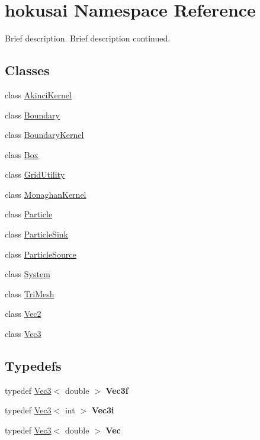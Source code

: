 \hypertarget{namespacehokusai}{\section{hokusai Namespace Reference}
\label{namespacehokusai}
}


Brief description. Brief description continued.  


\subsection*{Classes}
\begin{DoxyCompactItemize}
\item 
class \hyperlink{classhokusai_1_1AkinciKernel}{Akinci\+Kernel}
\item 
class \hyperlink{classhokusai_1_1Boundary}{Boundary}
\item 
class \hyperlink{classhokusai_1_1BoundaryKernel}{Boundary\+Kernel}
\item 
class \hyperlink{classhokusai_1_1Box}{Box}
\item 
class \hyperlink{classhokusai_1_1GridUtility}{Grid\+Utility}
\item 
class \hyperlink{classhokusai_1_1MonaghanKernel}{Monaghan\+Kernel}
\item 
class \hyperlink{classhokusai_1_1Particle}{Particle}
\item 
class \hyperlink{classhokusai_1_1ParticleSink}{Particle\+Sink}
\item 
class \hyperlink{classhokusai_1_1ParticleSource}{Particle\+Source}
\item 
class \hyperlink{classhokusai_1_1System}{System}
\item 
class \hyperlink{classhokusai_1_1TriMesh}{Tri\+Mesh}
\item 
class \hyperlink{classhokusai_1_1Vec2}{Vec2}
\item 
class \hyperlink{classhokusai_1_1Vec3}{Vec3}
\end{DoxyCompactItemize}
\subsection*{Typedefs}
\begin{DoxyCompactItemize}
\item 
\hypertarget{namespacehokusai_ac3f250cf2a411184737a6fd288c90b59}{typedef \hyperlink{classhokusai_1_1Vec3}{Vec3}$<$ double $>$ {\bfseries Vec3f}}\label{namespacehokusai_ac3f250cf2a411184737a6fd288c90b59}

\item 
\hypertarget{namespacehokusai_aac43f7e45c8dd98baefd1e55cd0dd15e}{typedef \hyperlink{classhokusai_1_1Vec3}{Vec3}$<$ int $>$ {\bfseries Vec3i}}\label{namespacehokusai_aac43f7e45c8dd98baefd1e55cd0dd15e}

\item 
\hypertarget{namespacehokusai_a965715759085edeee9da8b9adf0f3d67}{typedef \hyperlink{classhokusai_1_1Vec3}{Vec3}$<$ double $>$ {\bfseries Vec}}\label{namespacehokusai_a965715759085edeee9da8b9adf0f3d67}

\end{DoxyCompactItemize}
